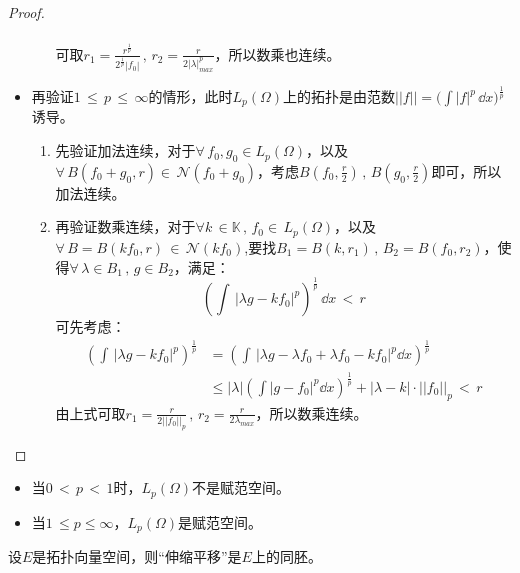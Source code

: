 \begin{proof}
\begin{itemize}
\begin{enumerate}
\begin{equation*}
\begin{aligned}
				\end{aligned}
			\end{equation*}
		可取$r_{1}=\frac{r^{\frac{1}{p}}}{2^{\frac{1}{p}}|f_{0}|}\, ,\, r_{2}=\frac{r}{2|\lambda|^{p}_{max}}$，所以数乘也连续。
		\end{enumerate}
	\item 再验证$1\, \leq \, p \, \leq \, \infty $的情形，此时$L_{p}(\Omega)$上的拓扑是由范数$||f||=\Big(\int |f|^{p}\,\dd x\Big)^{\frac{1}{p}}$诱导。
	\begin{enumerate}
		\item 先验证加法连续，对于$\forall \, f_{0},g_{0}\in L_{p}(\Omega)$，以及$\forall \, B(f_{0}+g_{0},r)\in \, \mathcal{N}(f_{0}+g_{0})$，考虑$B(f_{0},\frac{r}{2})\, , \, B(g_{0},\frac{r}{2})$即可，所以加法连续。
		\item 再验证数乘连续，对于$\forall k\, \in \mathbb{K}\, , \, f_{0}\in \, L_{p}(\Omega)$，以及$\forall \, B=B(kf_{0},r)\, \in \, \mathcal{N}(kf_{0})$,要找$B_{1}=B(k,r_{1})\, ,\, B_{2}=B(f_{0},r_{2})$，使得$\forall \, \lambda\in B_{1}\, ,\, g\in B_{2}$，满足：
		\begin{equation*}
			(\int \, |\lambda g-kf_{0}|^{p})^{\frac{1}{p}}\, \dd x \, <\, r
		\end{equation*}
	可先考虑：
	\begin{equation*}
		\begin{aligned}
				(\int \, |\lambda g-kf_{0}|^{p})^{\frac{1}{p}}&=(\int \, |\lambda g-\lambda f_{0}+\lambda f_{0}-kf_{0}|^{p}\dd x)^{\frac{1}{p}}\\
				&\leq |\lambda|(\int |g-f_{0}|^{p}\dd x)^{\frac{1}{p}}+|\lambda-k|\cdot||f_{0}||_{p}\, <\, r
		\end{aligned}
	\end{equation*}
	由上式可取$r_{1}=\frac{r}{2||f_{0}||_{p}}\,,\, r_{2}=\frac{r}{2\lambda_{max}}$，所以数乘连续。
	\end{enumerate}
	\end{itemize}
\end{proof}

\begin{remark}
	\begin{itemize}
		\item 当$0\, <\, p\, <\, 1$时，$L_{p}(\Omega)$不是赋范空间。
		\item 当$1\, \leq p \leq \infty$，$L_{p}(\Omega)$是赋范空间。
	\end{itemize}
\end{remark}

\begin{theorem}
	设$E$是拓扑向量空间，则“伸缩平移”是$E$上的同胚。
\end{theorem}

